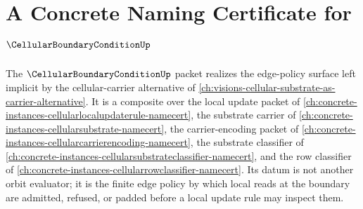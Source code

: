 \chapter{A Concrete Naming Certificate for $\CellularBoundaryConditionUp$}
\label{ch:concrete-instances-cellular-boundary-condition-namecert}

The $\CellularBoundaryConditionUp$ packet realizes the edge-policy surface left implicit by the cellular-carrier alternative of \autoref{ch:visions-cellular-substrate-as-carrier-alternative}. It is a composite over the local update packet of \autoref{ch:concrete-instances-cellularlocalupdaterule-namecert}, the substrate carrier of \autoref{ch:concrete-instances-cellularsubstrate-namecert}, the carrier-encoding packet of \autoref{ch:concrete-instances-cellularcarrierencoding-namecert}, the substrate classifier of \autoref{ch:concrete-instances-cellularsubstrateclassifier-namecert}, and the row classifier of \autoref{ch:concrete-instances-cellularrowclassifier-namecert}. Its datum is not another orbit evaluator; it is the finite edge policy by which local reads at the boundary are admitted, refused, or padded before a local update rule may inspect them.



